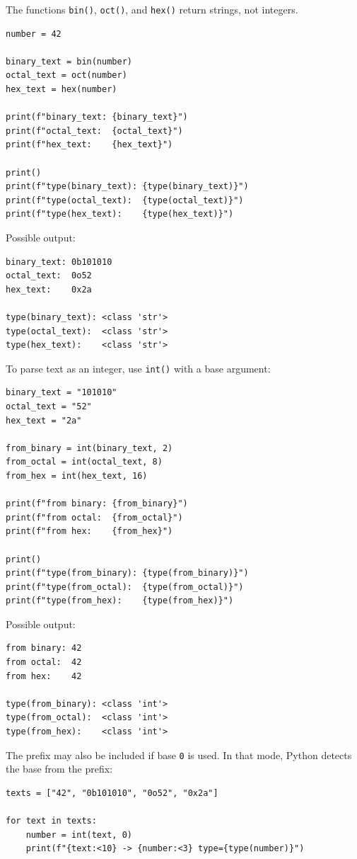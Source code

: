 The functions \texttt{bin()}, \texttt{oct()}, and \texttt{hex()} return strings, not integers.

\begin{verbatim}
number = 42

binary_text = bin(number)
octal_text = oct(number)
hex_text = hex(number)

print(f"binary_text: {binary_text}")
print(f"octal_text:  {octal_text}")
print(f"hex_text:    {hex_text}")

print()
print(f"type(binary_text): {type(binary_text)}")
print(f"type(octal_text):  {type(octal_text)}")
print(f"type(hex_text):    {type(hex_text)}")
\end{verbatim}

Possible output:

\begin{verbatim}
binary_text: 0b101010
octal_text:  0o52
hex_text:    0x2a

type(binary_text): <class 'str'>
type(octal_text):  <class 'str'>
type(hex_text):    <class 'str'>
\end{verbatim}

To parse text as an integer, use \texttt{int()} with a base argument:

\begin{verbatim}
binary_text = "101010"
octal_text = "52"
hex_text = "2a"

from_binary = int(binary_text, 2)
from_octal = int(octal_text, 8)
from_hex = int(hex_text, 16)

print(f"from binary: {from_binary}")
print(f"from octal:  {from_octal}")
print(f"from hex:    {from_hex}")

print()
print(f"type(from_binary): {type(from_binary)}")
print(f"type(from_octal):  {type(from_octal)}")
print(f"type(from_hex):    {type(from_hex)}")
\end{verbatim}

Possible output:

\begin{verbatim}
from binary: 42
from octal:  42
from hex:    42

type(from_binary): <class 'int'>
type(from_octal):  <class 'int'>
type(from_hex):    <class 'int'>
\end{verbatim}

The prefix may also be included if base \texttt{0} is used. In that mode, Python detects the base from the prefix:

\begin{verbatim}
texts = ["42", "0b101010", "0o52", "0x2a"]

for text in texts:
    number = int(text, 0)
    print(f"{text:<10} -> {number:<3} type={type(number)}")
\end{verbatim}

